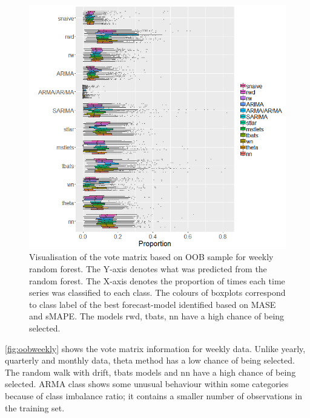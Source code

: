 \documentclass[11pt,a4paper,]{article}
\begin{document}
\begin{figure}
\centering
\includegraphics{figures/oobweekly-1.png}
\caption{\label{fig:oobweekly}Visualisation of the vote matrix based on OOB sample for weekly random forest. The Y-axis denotes what was predicted from the random forest. The X-axis denotes the proportion of times each time series was classified to each class. The colours of boxplots correspond to class label of the best forecast-model identified based on MASE and sMAPE. The models rwd, tbats, nn have a high chance of being selected.}
\end{figure}

\autoref{fig:oobweekly} shows the vote matrix information for weekly data. Unlike yearly, quarterly and monthly data, theta method has a low chance of being selected. The random walk with drift, tbats models and nn have a high chance of being selected. ARMA class shows some unusual behaviour within some categories because of class imbalance ratio; it contains a smaller number of observations in the training set.
\end{document}
